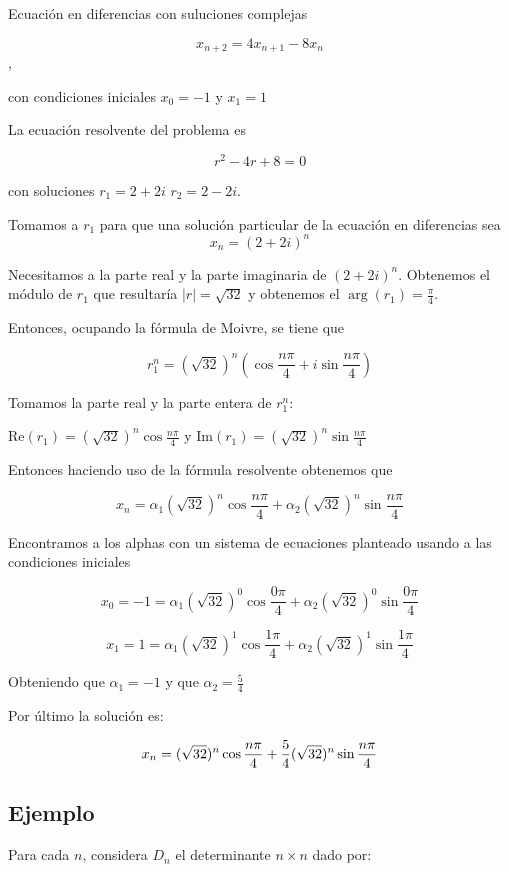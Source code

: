 \documentclass{report}
\begin{document}
Ecuación en diferencias con suluciones complejas

$$x_{n+2}=4x_{n+1}-8x_{n}$$,

con condiciones iniciales $x_{0}=-1$ y $x_{1}=1$

 La ecuación resolvente del problema es

 $$r^2-4r+8=0$$

 con soluciones $r_{1}=2+2i$ $r_{2}=2-2i$.

\bigskip

 Tomamos a $r_{1}$ para que una solución particular de la ecuación en diferencias sea $$x_{n}=(2+2i)^n$$

Necesitamos a la parte real y la parte imaginaria de $(2+2i)^n$. Obtenemos el módulo de $r_{1}$ que resultaría $|r|= \sqrt{32}$ y obtenemos el $\arg(r_{1})=\frac{\pi}{4}$.

Entonces, ocupando la fórmula de Moivre, se tiene que

$$r_{1}^n=(\sqrt{32})^n(\cos{\frac{n\pi}{4}}+i\sin{\frac{n\pi}{4}})$$


Tomamos la parte real y la parte entera de $r_{1}^n$:

$\mathrm{Re}(r_{1})=(\sqrt{32})^n\cos{\frac{n\pi}{4}}$ y $\mathrm{Im}(r_{1})=(\sqrt{32})^n\sin{\frac{n\pi}{4}}$

  Entonces haciendo uso de la fórmula resolvente obtenemos que

  $$x_{n}=\alpha_{1}(\sqrt{32})^n\cos{\frac{n\pi}{4}} + \alpha_{2}(\sqrt{32})^n\sin{\frac{n\pi}{4}}$$

    Encontramos a los alphas con un sistema de ecuaciones planteado usando a las condiciones iniciales

    $$x_{0}=-1=\alpha_{1}(\sqrt{32})^0\cos{\frac{0\pi}{4}} + \alpha_{2}(\sqrt{32})^0\sin{\frac{0\pi}{4}}$$
      
     $$x_{1}=1=\alpha_{1}(\sqrt{32})^1\cos{\frac{1\pi}{4}} + \alpha_{2}(\sqrt{32})^1\sin{\frac{1\pi}{4}}$$

        Obteniendo que $\alpha_{1}=-1$ y que $\alpha_{2}=\frac{5}{4}$

        Por último la solución
 es:

         $$x_{n}=\-(\sqrt{32})^n\cos{\frac{n\pi}{4}} + \frac{5}{4}(\sqrt{32})^n\sin{\frac{n\pi}{4}}$$


\subsection{Ejemplo}

Para cada $n$, considera $D_{n}$ el determinante $n\times n$ dado por:
\end{document}
